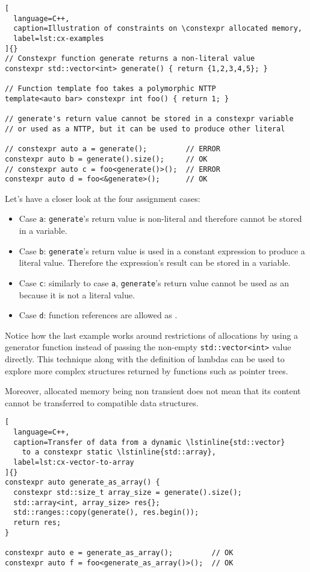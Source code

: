 \documentclass[../main]{subfiles}
\begin{document}
\begin{lstlisting}[
  language=C++,
  caption=Illustration of constraints on \constexpr allocated memory,
  label=lst:cx-examples
]{}
// Constexpr function generate returns a non-literal value
constexpr std::vector<int> generate() { return {1,2,3,4,5}; }

// Function template foo takes a polymorphic NTTP
template<auto bar> constexpr int foo() { return 1; }

// generate's return value cannot be stored in a constexpr variable
// or used as a NTTP, but it can be used to produce other literal

// constexpr auto a = generate();         // ERROR
constexpr auto b = generate().size();     // OK
// constexpr auto c = foo<generate()>();  // ERROR
constexpr auto d = foo<&generate>();      // OK
\end{lstlisting}

Let's have a closer look at the four assignment cases:

\begin{itemize}
\item Case \lstinline{a}: \lstinline{generate}'s return value is non-literal
      and therefore cannot be stored in a \constexpr variable.
\item Case \lstinline{b}: \lstinline{generate}'s return value is used in a
      constant expression to produce a literal value.
      Therefore the expression's result can be stored in a \constexpr variable.
\item Case \lstinline{c}: similarly to case \lstinline{a},
      \lstinline{generate}'s return value cannot be used as an \nttp because it
      is not a literal value.
\item Case \lstinline{d}: function references are allowed as \nttps.
\end{itemize}

Notice how the last example works around restrictions of \constexpr allocations
by using a generator function instead of passing the non-empty
\lstinline{std::vector<int>} value directly. This technique along with the
definition of lambdas can be used to explore more complex structures returned by
\constexpr functions such as pointer trees.

Moreover, \constexpr allocated memory being non transient does not mean that its
content cannot be transferred to \nttp compatible data structures.

\begin{lstlisting}[
  language=C++,
  caption=Transfer of data from a dynamic \lstinline{std::vector}
    to a constexpr static \lstinline{std::array},
  label=lst:cx-vector-to-array
]{}
constexpr auto generate_as_array() {
  constexpr std::size_t array_size = generate().size();
  std::array<int, array_size> res{};
  std::ranges::copy(generate(), res.begin());
  return res;
}

constexpr auto e = generate_as_array();         // OK
constexpr auto f = foo<generate_as_array()>();  // OK
\end{lstlisting}
\end{document}

